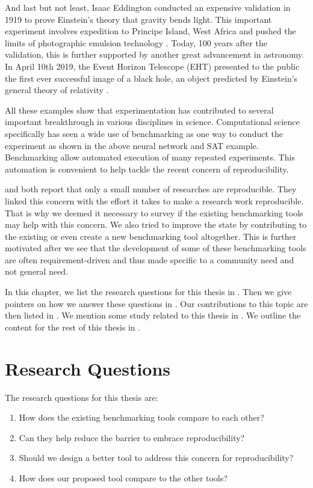 And last but not least, Isaac Eddington conducted an expensive validation in 1919 to prove Einstein's theory that gravity bends light.
This important experiment involves expedition to Principe Island, West Africa and pushed the limits of photographic emulsion technology \citep{tichyShouldComputerScientists1998}.
Today, 100 years after the validation, this is further supported by another great advancement in astronomy.
In April 10th 2019, the Event Horizon Telescope (EHT) presented to the public the first ever successful image of a black hole, an object predicted by Einstein's general theory of relativity \citep{akiyama2019first}.

All these examples show that experimentation has contributed to several important breakthrough in various disciplines in science.
Computational science specifically has seen a wide use of benchmarking as one way to conduct the experiment as shown in the above neural network and SAT example.
Benchmarking allow automated execution of many repeated experiments.
This automation is convenient to help tackle the recent concern of reproducibility.

\citet{gundersenStateArtReproducibility2018} and \citet{collbergRepeatabilityComputerSystems2016} both report that only a small number of researches are reproducible.
They linked this concern with the effort it takes to make a research work reproducible.
That is why we deemed it necessary to survey if the existing benchmarking tools may help with this concern.
We also tried to improve the state by contributing to the existing or even create a new benchmarking tool altogether.
This is further motivated after we see that the development of some of these benchmarking tools are often requirement-driven and thus made specific to a community need and not general need.

In this chapter, we list the research questions for this thesis in .
Then we give pointers on how we answer these questions in .
Our contributions to this topic are then listed in .
We mention some study related to this thesis in .
We outline the content for the rest of this thesis in .

\section{Research Questions}
\label{sec:intro.questions}

The research questions for this thesis are:
\begin{enumerate}
	\item How does the existing benchmarking tools compare to each other?
	\item Can they help reduce the barrier to embrace reproducibility?
	\item Should we design a better tool to address this concern for reproducibility?
	\item How does our proposed tool compare to the other tools?
\end{enumerate}

